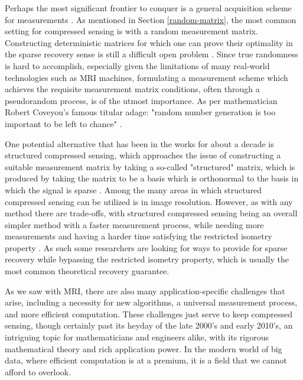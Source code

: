 \documentclass[12pt,a4paper]{amsart}
\numberwithin{equation}{section}
\theoremstyle{plain}
\theoremstyle{definition}
\begin{document}
Perhaps the most significant frontier to conquer is a general acquisition scheme for measurements \cite{rani}. As mentioned in Section \ref{random-matrix}, the most common setting for compressed sensing is with a random measurement matrix. Constructing deterministic matrices for which one can prove their optimality in the sparse recovery sense is still a difficult open problem \cite{fou-rau}. Since true randomness is hard to accomplish, especially given the limitations of many real-world technologies such as MRI machines, formulating a measurement scheme which achieves the requisite measurement matrix conditions, often through a pseudorandom process, is of the utmost importance. As per mathematician Robert Coveyou's famous titular adage: "random number generation is too important to be left to chance" \cite{coveyou}.

One potential alternative that has been in the works for about a decade is structured compressed sensing, which approaches the issue of constructing a suitable measurement matrix by taking a so-called "structured" matrix, which is produced by taking the matrix to be a basis which is orthonormal to the basis in which the signal is sparse \cite{fou-rau}. Among the many areas in which structured compressed sensing can be utilized is in image resolution. However, as with any method there are trade-offs, with structured compressed sensing being an overall simpler method with a faster measurement process, while needing more measurements and having a harder time satisfying the restricted isometry property \cite{rani}. As such some researchers are looking for ways to provide for sparse recovery while bypassing the restricted isometry property, which is usually the most common theoretical recovery guarantee.

As we saw with MRI, there are also many application-specific challenges that arise, including a necessity for new algorithms, a universal measurement process, and more efficient computation. These challenges just serve to keep compressed sensing, though certainly past its heyday of the late 2000's and early 2010's, an intriguing topic for mathematicians and engineers alike, with its rigorous mathematical theory and rich application power. In the modern world of big data, where efficient computation is at a premium, it is a field that we cannot afford to overlook.
\end{document}

